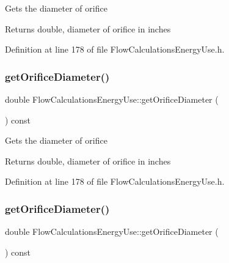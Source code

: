 Gets the diameter of orifice

\begin{DoxyReturn}{Returns}
double, diameter of orifice in inches 
\end{DoxyReturn}


Definition at line 178 of file Flow\+Calculations\+Energy\+Use.\+h.

\mbox{\label{class_flow_calculations_energy_use_a71c34f09ec3524db321b8934930700c5}} 
\subsubsection{\texorpdfstring{get\+Orifice\+Diameter()}{getOrificeDiameter()}\hspace{0.1cm}{\footnotesize\ttfamily [2/3]}}
{\footnotesize\ttfamily double Flow\+Calculations\+Energy\+Use\+::get\+Orifice\+Diameter (\begin{DoxyParamCaption}{ }\end{DoxyParamCaption}) const\hspace{0.3cm}{\ttfamily [inline]}}

Gets the diameter of orifice

\begin{DoxyReturn}{Returns}
double, diameter of orifice in inches 
\end{DoxyReturn}


Definition at line 178 of file Flow\+Calculations\+Energy\+Use.\+h.

\mbox{\label{class_flow_calculations_energy_use_a71c34f09ec3524db321b8934930700c5}} 
\subsubsection{\texorpdfstring{get\+Orifice\+Diameter()}{getOrificeDiameter()}\hspace{0.1cm}{\footnotesize\ttfamily [3/3]}}
{\footnotesize\ttfamily double Flow\+Calculations\+Energy\+Use\+::get\+Orifice\+Diameter (\begin{DoxyParamCaption}{ }\end{DoxyParamCaption}) const\hspace{0.3cm}{\ttfamily [inline]}}

